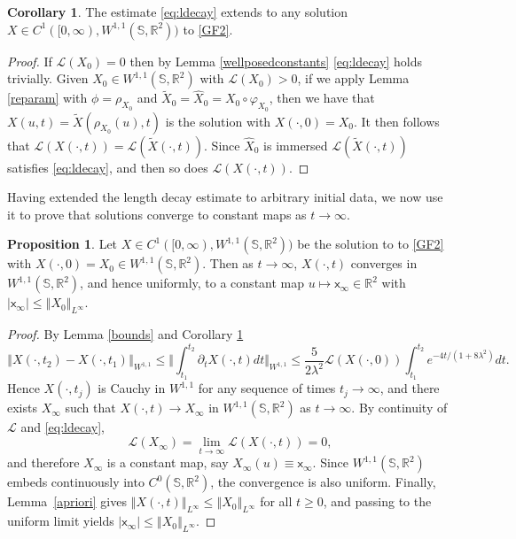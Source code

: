\documentclass[a4paper,11pt]{amsart}
\theoremstyle{definition}\newtheorem*{definition}{Definition}
\theoremstyle{definition} \newtheorem{proposition}[theorem]{Proposition}
\theoremstyle{definition}\newtheorem{lemma}[theorem]{Lemma}
\theoremstyle{definition}\newtheorem{corollary}[theorem]{Corollary}
\theoremstyle{definition}\newtheorem{example}{Example}
\theoremstyle{remark}\newtheorem*{remark}{Remark}
\def\R{\mathbb{R}}
\def\S{\mathbb{S}}
\def\x{\mathsf{x}}
\newcommand{\norm}[1]{{\left \Vert {#1}\right \Vert}}
\newcommand{\abs}[1]{\left | {#1}\right |}
\def\length{\mathcal L}
\def\wsr{W^{1,1}(\S,\R^2)}
\begin{document}
\begin{corollary}\label{lengthdecayall}
    The estimate \eqref{eq:ldecay} extends to any solution $X\in C^1([0,\infty),\wsr)$ to \eqref{GF2}. 
\end{corollary}
\begin{proof}
If $\length(X_0)=0$ then by Lemma \ref{wellposedconstants} \eqref{eq:ldecay} holds trivially.
Given $X_0\in \wsr$ with $\length(X_0)>0$, if we apply Lemma \ref{reparam} with $\phi=\rho_{X_0}$ and $\tilde X_0=\hat X_0=X_0\circ \varphi_{X_0}$, then we have that $X(u,t)=\tilde X(\rho_{X_0}(u),t)$ is the solution with $X(\cdot,0)=X_0$. It then follows that $\length(X(\cdot, t))=\length(\tilde X(\cdot,t)).$ Since $\hat X_0$ is immersed $\length(\tilde X(\cdot,t))$ satisfies \eqref{eq:ldecay}, and then so does $\length(X(\cdot, t))$.
\end{proof}

Having extended the length decay estimate to arbitrary initial data, we now use it to prove that solutions converge to constant maps as $t\to \infty$.


\begin{proposition}\label{longtimebehaviour}
Let 
$X\in C^1([0,\infty),W^{1,1}(\S,\R^2))$ be the solution to to \eqref{GF2} with $X(\cdot,0)=X_0\in W^{1,1}(\S,\R^2)$. Then as $t\to \infty$,
$
X(\cdot,t)
$
converges in $W^{1,1}(\S,\R^2)$, and hence uniformly, to a constant map $u\mapsto \x_\infty \in \R^2$ with ${\abs{\x_\infty}\leq \norm{X_0}_{L^\infty}}$. 
\end{proposition}
\begin{proof}
By Lemma \ref{bounds} and Corollary \ref{lengthdecayall}
\[
\norm{X(\cdot,t_2)-X(\cdot,t_1)}_{W^{1,1}}\leq \Big\Vert \int_{t_1}^{t_2}\partial_t X(\cdot,t)dt\Big\Vert_{W^{1,1}}\leq \frac{5}{2\lambda^2}\length(X(\cdot,0))\int_{t_1}^{t_2}e^{-4t/(1+8\lambda^2)}dt.
\]
Hence $X(\cdot,t_j)$ is Cauchy in $W^{1,1}$ for any sequence of times $t_j\to\infty$, and there exists $X_\infty$ such that
$X(\cdot,t)\to X_\infty$
in $W^{1,1}(\S,\R^2)$
as $t\to\infty.$
By continuity of $\length$ and \eqref{eq:ldecay},
\[
\length(X_\infty)=\lim_{t\to\infty}\length(X(\cdot,t))=0,
\]
and therefore $X_\infty$ is a constant map, say $X_\infty(u)\equiv \x_\infty$. Since $W^{1,1}(\S,\R^2)$ embeds continuously into $C^0(\S,\R^2)$, the convergence is also uniform. Finally, Lemma~\ref{apriori} gives
$
\norm{X(\cdot,t)}_{L^\infty}\le \norm{X_0}_{L^\infty}
$
for all $t\ge0$, and passing to the uniform limit yields
$|\x_\infty|\le \norm{X_0}_{L^\infty}.$


\end{proof}
\end{document}
